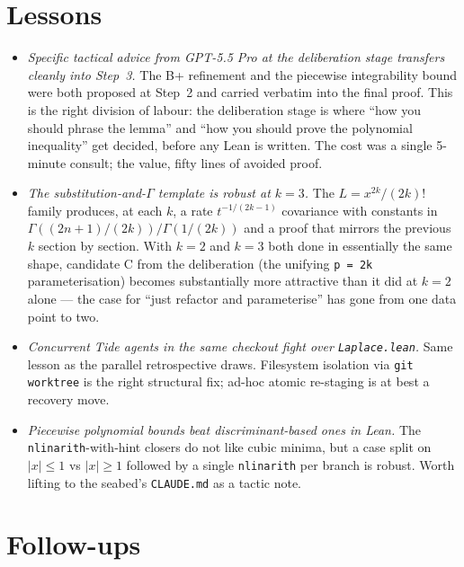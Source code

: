 \documentclass[11pt]{article}
\begin{document}
\section{Lessons}

\begin{itemize}
\item \emph{Specific tactical advice from GPT-5.5 Pro at the deliberation
stage transfers cleanly into Step~3.} The B+ refinement and the piecewise
integrability bound were both proposed at Step~2 and carried verbatim into
the final proof. This is the right division of labour: the deliberation
stage is where ``how you should phrase the lemma'' and ``how you should
prove the polynomial inequality'' get decided, before any Lean is written.
The cost was a single 5-minute consult; the value, fifty lines of avoided
proof.

\item \emph{The substitution-and-$\Gamma$ template is robust at $k=3$.} The
$L = x^{2k}/(2k)!$ family produces, at each $k$, a rate $t^{-1/(2k-1)}$
covariance with constants in $\Gamma((2n+1)/(2k))/\Gamma(1/(2k))$ and a
proof that mirrors the previous $k$ section by section. With $k=2$ and
$k=3$ both done in essentially the same shape, candidate C from the
deliberation (the unifying \texttt{p = 2k} parameterisation) becomes
substantially more attractive than it did at $k=2$ alone --- the case for
``just refactor and parameterise'' has gone from one data point to two.

\item \emph{Concurrent Tide agents in the same checkout fight over
\texttt{Laplace.lean}.} Same lesson as the parallel retrospective draws.
Filesystem isolation via \texttt{git worktree} is the right structural fix;
ad-hoc atomic re-staging is at best a recovery move.

\item \emph{Piecewise polynomial bounds beat discriminant-based ones in
Lean.} The \texttt{nlinarith}-with-hint closers do not like cubic minima,
but a case split on $|x| \leq 1$ vs $|x| \geq 1$ followed by a single
\texttt{nlinarith} per branch is robust. Worth lifting to the seabed's
\texttt{CLAUDE.md} as a tactic note.
\end{itemize}

\section{Follow-ups}
\end{document}
